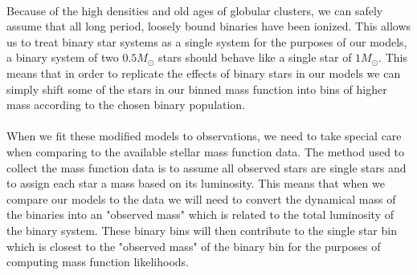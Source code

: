 \documentclass[12pt,letterpaper]{article}
\begin{document}
\paragraph{}
Because of the high densities and old ages of globular clusters, we can safely assume that all long
period, loosely bound binaries have been ionized. This allows us to treat binary star systems as a
single system for the purposes of our models, a binary system of two $0.5 M_\odot$ stars should
behave like a single star of $ 1 M_\odot$. This means that in order to replicate the effects of
binary stars in our models we can simply shift some of the stars in our binned mass function into
bins of higher mass according to the chosen binary population.
\paragraph{}
When we fit these modified models to observations, we need to take special care when comparing to
the available stellar mass function data. The method used to collect the mass function data is to
assume all observed stars are single stars and to assign each star a mass based on its luminosity.
This means that when we compare our models to the data we will need to convert the dynamical mass of
the binaries into an "observed mass" which is related to the total luminosity of the binary system.
These binary bins will then contribute to the single star bin which is closest to the "observed
mass" of the binary bin for the purposes of computing mass function likelihoods.
\end{document}
